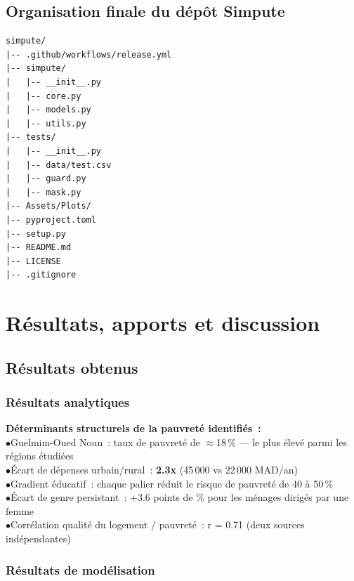 \documentclass[12pt,a4paper]{report}
\begin{document}
\section{Organisation finale du dépôt Simpute}

\begin{lstlisting}[style=treenostyle, caption={Structure du depot Simpute}]
simpute/
|-- .github/workflows/release.yml
|-- simpute/
|   |-- __init__.py
|   |-- core.py
|   |-- models.py
|   |-- utils.py
|-- tests/
|   |-- __init__.py
|   |-- data/test.csv
|   |-- guard.py
|   |-- mask.py
|-- Assets/Plots/
|-- pyproject.toml
|-- setup.py
|-- README.md
|-- LICENSE
|-- .gitignore
\end{lstlisting}

\chapter{Résultats, apports et discussion}

\section{Résultats obtenus}

\subsection{Résultats analytiques}

\begin{resultbox}
\textbf{Déterminants structurels de la pauvreté identifiés~:}\\[4pt]
$\bullet$\quad Guelmim-Oued Noun~: taux de pauvreté de $\approx$18\,\% --- le plus élevé parmi les régions étudiées\\
$\bullet$\quad Écart de dépenses urbain/rural~: \textbf{2.3x} (45\,000 vs 22\,000 MAD/an)\\
$\bullet$\quad Gradient éducatif~: chaque palier réduit le risque de pauvreté de 40 à 50\,\%\\
$\bullet$\quad Écart de genre persistant~: +3.6 points de \% pour les ménages dirigés par une femme\\
$\bullet$\quad Corrélation qualité du logement / pauvreté~: r = 0.71 (deux sources indépendantes)
\end{resultbox}

\subsection{Résultats de modélisation}
\end{document}
